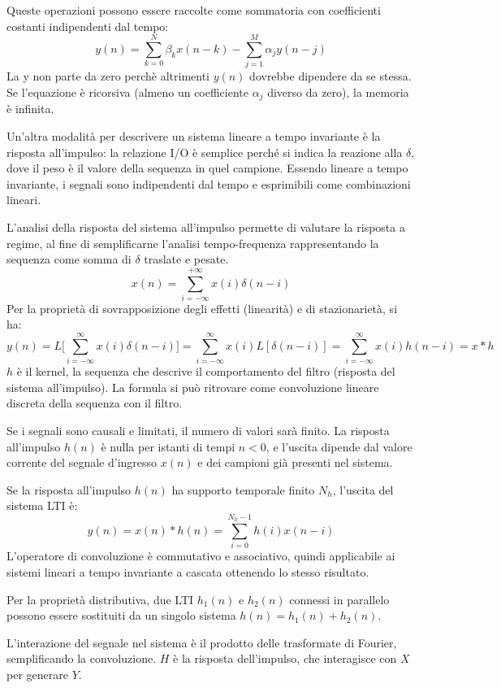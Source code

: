 Queste operazioni possono essere raccolte come sommatoria con coefficienti costanti indipendenti dal tempo:
$$y(n) = \sum_{k=0}^{N} \beta_kx(n - k) - \sum_{j=1}^{M} \alpha_jy(n - j)$$
La y non parte da zero perchè altrimenti $y(n)$ dovrebbe dipendere da se stessa. Se l'equazione è ricorsiva (almeno un coefficiente $\alpha_j$ diverso da zero), la memoria è infinita.

Un'altra modalità per descrivere un sistema lineare a tempo invariante è la risposta all'impulso: la relazione I/O è semplice perché si indica la reazione alla $\delta$, dove il peso è il valore della sequenza in quel campione. Essendo lineare a tempo invariante, i segnali sono indipendenti dal tempo e esprimibili come combinazioni lineari. 

L'analisi della risposta del sistema all'impulso permette di valutare la risposta a regime, al fine di semplificarne l'analisi tempo-frequenza rappresentando la sequenza come somma di $\delta$ traslate e pesate.
$$x(n) = \sum_{i=-\infty}^{+\infty}x(i)\delta(n-i)$$
Per la proprietà di sovrapposizione degli effetti (linearità) e di stazionarietà, si ha:
$$y(n) = L\Big[\sum_{i=-\infty}^{\infty}x(i)\delta(n - i)\Big] = \sum_{i=-\infty}^{\infty}x(i)L[\delta(n - i)] = \sum_{i=-\infty}^{\infty}x(i)h(n - i) = x * h$$
$h$ è il kernel, la sequenza che descrive il comportamento del filtro (risposta del sistema all'impulso). La formula si può ritrovare come convoluzione lineare discreta della sequenza con il filtro.

Se i segnali sono causali e limitati, il numero di valori sarà finito. La risposta all'impulso $h(n)$ è nulla per istanti di tempi $n < 0$, e l'uscita dipende dal valore corrente del segnale d'ingresso $x(n)$ e dei campioni già presenti nel sistema. 

Se la risposta all'impulso $h(n)$ ha supporto temporale finito $N_h$, l'uscita del sistema LTI è:
$$y(n) = x(n) * h(n) = \sum_{i=0}^{N_h-1}h(i)x(n - i)$$
L'operatore di convoluzione è commutativo e associativo, quindi applicabile ai sistemi lineari a tempo invariante a cascata ottenendo lo stesso risultato.

Per la proprietà distributiva, due LTI $h_1(n)$ e $h_2(n)$ connessi in parallelo possono essere sostituiti da un singolo sistema $h(n) = h_1(n) + h_2(n)$.

L'interazione del segnale nel sistema è il prodotto delle trasformate di Fourier, semplificando la convoluzione. $H$ è la risposta dell'impulso, che interagisce con $X$ per generare $Y$.  

